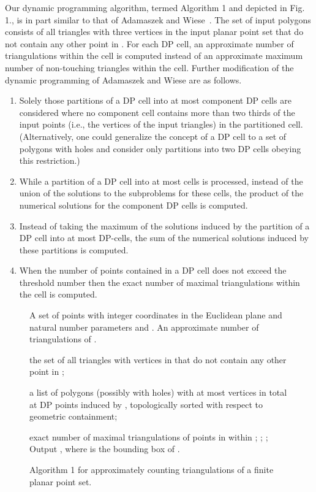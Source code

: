 \documentclass[a4paper]{article}
\begin{document}
Our  dynamic programming algorithm, termed Algorithm 1
and depicted in Fig. 1.,
is in part similar to that of Adamaszek and Wiese~\cite{AW14}.
The set of input polygons consists
of all triangles with three vertices
in the input planar point set 
that do not contain any other
point in . 
For each DP cell, an approximate
number of triangulations
within the cell is computed
instead of an approximate
maximum number of non-touching triangles
within the cell.
Further modification
of the dynamic programming
of Adamaszek and Wiese are as follows.
\begin{enumerate}
\item
Solely those partitions of a DP cell
into at most  component DP cells
are considered where no component cell contains
more than two thirds of the
input points 
(i.e., the vertices
of the input triangles) 
in the partitioned cell.
(Alternatively, one could
generalize the concept of a DP cell
to a set of polygons with holes
and consider only partitions into two
DP cells obeying this restriction.)
\item
While a partition of a DP cell
into at most  cells is 
processed, instead of the
union of the solutions
to the subproblems for
these cells, the product
of the numerical solutions
for the component DP cells
is computed. 
\item
Instead of taking the maximum
of the solutions induced
by the partition of a DP cell into at
most  DP-cells, 
the sum of the numerical solutions 
induced by these partitions is computed.
\item
When the number of points
contained in a DP cell 
does not exceed the threshold number
 then 
the exact number of maximal triangulations
within the cell is computed.
\end{enumerate}


\begin{figure}
\begin{algorithmic}[1]
\REQUIRE A set  of  points with integer
coordinates in the Euclidean plane
and natural number parameters  and . 
\ENSURE  An approximate number of triangulations of . 

\STATE 
the set of all triangles
with vertices in 
that do not contain 
any other point in ;

\STATE  a list 
of polygons (possibly with holes)
with at most  vertices in total
at DP points induced by ,
topologically sorted 
with respect to geometric containment;

\STATE  exact number
of maximal triangulations
of points in  
within ;
\ENDFOR
{} 
\STATE ;
\STATE ;
\ENDFOR
\ENDFOR
\STATE Output , where  is
the bounding box of .
\end{algorithmic}
\caption{Algorithm 1 for approximately counting
triangulations of a finite planar point set.}
\label{fig: algo1}
\end{figure}
\end{document}
